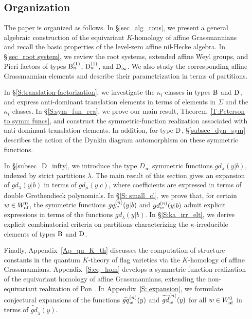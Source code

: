 \documentclass[a4paper]{amsart}
\newcommand{\smark}[1]{\todo[size=\tiny,color=cyan!30]{#1}}
\theoremstyle{remark}
\numberwithin{equation}{section}
\begin{document}

\subsection{Organization}
The paper is organized as follows. In \S \ref{sec_alg_cons}, we present a general algebraic construction of the equivariant \(K\)-homology of affine Grassmannians and recall the basic properties of the level-zero affine nil-Hecke algebra. In \S \ref{sec_root system}, we review the root systems, extended affine Weyl groups, and Pieri factors of types \(\B{n}^{(1)}\), \(\D{n}^{(1)}\), and \(\D{\infty}\). We also study the corresponding affine Grassmannian elements and describe their parametrization in terms of partitions.

In \S \ref{S:translation-factorization}, we investigate the \(\kappa_i\)-classes in types \(\B{}\) and \(\D{}\), and express anti-dominant translation elements in terms of elements in $\Sigma$ and the \(\kappa_i\)-classes. In \S \ref{S:sym_fun_rea}, we prove our main result, Theorem~\ref{T:Peterson to symm funcs}, and construct the symmetric-function realization associated with anti-dominant translation elements. In addition, for type $\D{}$, \S \ref{subsec_dyn_sym} describes the action of the Dynkin diagram automorphism on these symmetric functions.

In \S \ref{subsec_D_infty}, we introduce the type \(D_\infty\) symmetric functions \(gd_\lambda(y| b)\), indexed by strict partitions \(\lambda\). The main result of this section gives an expansion of \(gd_\lambda(y| b)\) in terms of \(gd_\mu(y| c)\), where coefficients are expressed in terms of double Grothendieck polynomials. In \S \ref{S: small_cl}, we prove that, for certain \(w\in\Wafgr\), the symmetric functions \(\gq{w}{n}(y| b)\) and \(\gd{w}{n}(y| b)\) admit explicit expressions in terms of the functions \(gd_\lambda(y| b)\). In \S \ref{S:ka_irr_elt}, we derive explicit combinatorial criteria on partitions characterizing the \(\kappa\)-irreducible elements of types \(\B{}\) and \(\D{}\).

Finally, Appendix~\ref{Ap_qu_K_th} discusses the computation of structure constants in the quantum \(K\)-theory of flag varieties via the \(K\)-homology of affine Grassmannians. Appendix~\ref{S:eq_hom} develops a symmetric-function realization of the equivariant homology of affine Grassmannians, extending the non-equivariant realization of Pon \cite{Pon}. In Appendix~\ref{S: expansion}, we formulate conjectural expansions of the functions \(\tgq{w}{n}(y)\) and \(\tgd{w}{n}(y)\) for all $w\in \Wafgr$ in terms of \(\widetilde{gd}_\lambda(y)\).
\end{document}
